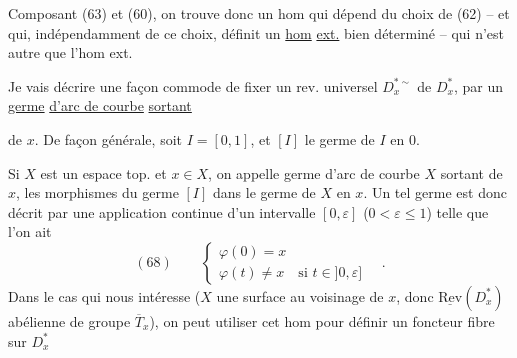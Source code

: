 Composant (63) et (60), on trouve donc un hom
qui dépend du choix de (62) -- et qui, indépendamment de ce choix, définit un \uline{hom} \uline{ext.} bien déterminé -- qui n'est autre que l'hom ext.

Je vais décrire une façon commode de fixer un rev. universel $D_x^{*\sim}$ de $D_x^*$, par un \uline{germe} \uline{d'arc de courbe}  \uline{sortant}

de $x$. De façon générale, soit $I=[0,1]$, et $[I]$ le germe  de $I$ en $0$.  


Si $X$ est un espace top. et $x\in X$, on appelle germe d'arc de courbe  $X$ sortant de $x$, les morphismes
du germe $[I]$ dans le germe   de $X$ en $x$. Un tel germe est donc décrit par une application continue d'un intervalle $[0,\varepsilon]$ ($0<\varepsilon\leq1$)
telle que l'on ait
\[
(68)\qquad\left\{\begin{array}{l}
\varphi(0)=x\\
\varphi(t)\neq x\quad\text{si }t\in]0,\varepsilon]
\end{array}\right.\quad.
\]
Dans le cas qui nous intéresse ($X$ une surface au voisinage de $x$, donc $\underline{\mathrm{Rev}}(D_x^*)$   abélienne de groupe $\overline T_x$), on peut utiliser cet hom pour définir un foncteur fibre sur $D_x^*$

